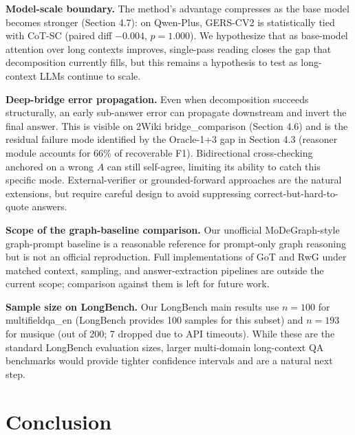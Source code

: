 \documentclass[11pt,a4paper]{article}
\begin{document}
\textbf{Model-scale boundary.} The method's advantage compresses as the base model becomes stronger (Section 4.7): on Qwen-Plus, GERS-CV2 is statistically tied with CoT-SC (paired diff $-0.004$, $p=1.000$). We hypothesize that as base-model attention over long contexts improves, single-pass reading closes the gap that decomposition currently fills, but this remains a hypothesis to test as long-context LLMs continue to scale.

\textbf{Deep-bridge error propagation.} Even when decomposition succeeds structurally, an early sub-answer error can propagate downstream and invert the final answer. This is visible on 2Wiki bridge\_comparison (Section 4.6) and is the residual failure mode identified by the Oracle-1+3 gap in Section 4.3 (reasoner module accounts for 66\% of recoverable F1). Bidirectional cross-checking anchored on a wrong $A$ can still self-agree, limiting its ability to catch this specific mode. External-verifier or grounded-forward approaches are the natural extensions, but require careful design to avoid suppressing correct-but-hard-to-quote answers.

\textbf{Scope of the graph-baseline comparison.} Our unofficial MoDeGraph-style graph-prompt baseline is a reasonable reference for prompt-only graph reasoning but is not an official reproduction. Full implementations of GoT and RwG under matched context, sampling, and answer-extraction pipelines are outside the current scope; comparison against them is left for future work.

\textbf{Sample size on LongBench.} Our LongBench main results use $n=100$ for multifieldqa\_en (LongBench provides 100 samples for this subset) and $n=193$ for musique (out of 200; 7 dropped due to API timeouts). While these are the standard LongBench evaluation sizes, larger multi-domain long-context QA benchmarks would provide tighter confidence intervals and are a natural next step.

\section{Conclusion}
\end{document}
